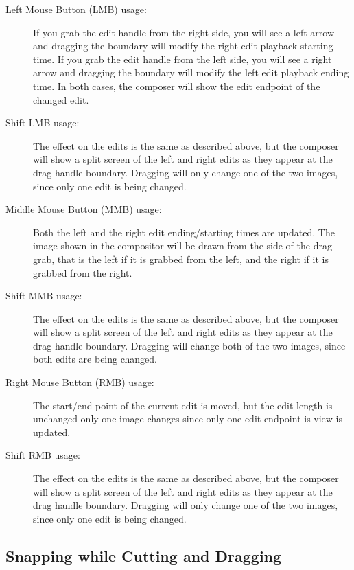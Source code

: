 \begin{description}
    \item[Left Mouse Button (LMB) usage:] If you grab the edit handle from the right side, you will see a left arrow and dragging the boundary will modify the right edit playback starting time. If you grab the edit handle from the left side, you will see a right arrow and dragging the boundary will modify the left edit playback ending time. In both cases, the composer will show the edit endpoint of the changed edit.
    \item[Shift LMB usage:] The effect on the edits is the same as described above, but the composer will show a split screen of
    the left and right edits as they appear at the drag handle boundary. Dragging will only change one of the two images, since only one edit is being changed.
    \item[Middle Mouse Button (MMB) usage:] Both the left and the right edit ending/starting times are updated.  The image shown in the compositor will be drawn from the side of the drag grab, that is the left if it is grabbed from the left, and the right if it is grabbed from the right.
    \item[Shift MMB usage:] The effect on the edits is the same as described above, but the composer will show a split screen of
    the left and right edits as they appear at the drag handle boundary.  Dragging will change both of the two images, since both edits are being changed.
    \item[Right Mouse Button (RMB) usage:] The start/end point of the current edit is moved, but the edit length is unchanged only one image changes since only one edit endpoint is view is updated.
    \item[Shift RMB usage:] The effect on the edits is the same as described above, but the composer will show a split screen of
    the left and right edits as they appear at the drag handle boundary.  Dragging will only change one of the two images, since only one edit is being changed.
\end{description}

\subsection{Snapping while Cutting and Dragging}%
\label{sub:snapping_cutting_dragging}

